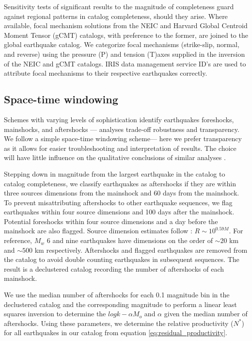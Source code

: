 \documentclass[12pt, notitlepage]{report}
\begin{document}
Sensitivity tests of significant results to the magnitude of completeness guard against regional patterns in catalog completeness, should they arise. Where available, focal mechanism solutions from the NEIC and Harvard Global Centroid Moment Tensor (gCMT) catalogs, with preference to the former, are joined to the global earthquake catalog. We categorize focal mechanisms (strike-slip, normal, and reverse) using the pressure (P) and tension (T)axes supplied in the inversion of the NEIC and gCMT catalogs. IRIS data management service ID's are used to attribute focal mechanisms to their respective earthquakes correctly. 

\subsection{Space-time windowing}

Schemes with varying levels of sophistication identify earthquakes foreshocks, mainshocks, and aftershocks — analyses trade-off robustness and transparency. We follow a simple space-time windowing scheme--- here we prefer transparency as it allows for easier troubleshooting and interpretation of results. The choice will have little influence on the qualitative conclusions of similar analyses \cite{Utsu1995}.

Stepping down in magnitude from the largest earthquake in the catalog to catalog completeness, we classify earthquakes as aftershocks if they are within three sources dimensions from the mainshock and 60 days from the mainshock. To prevent misattributing aftershocks to other earthquake sequences, we flag earthquakes within four source dimensions and 100 days after the mainshock. Potential foreshocks within four source dimensions and a day before the mainshock are also flagged. Source dimension estimates follow \textcite{Wells1994}: $R\sim10^{0.59M}$. For reference, $M_w$ 6 and nine earthquakes have dimensions on the order of $\sim 20$ km and $\sim 500$ km respectively. Aftershocks and flagged earthquakes are removed from the catalog to avoid double counting earthquakes in subsequent sequences. The result is a declustered catalog recording the number of aftershocks of each mainshock. 

We use the median number of aftershocks for each 0.1 magnitude bin in the declustered catalog and the corresponding magnitude to perform a linear least squares inversion to determine the $ log k - \alpha M_o $ and $\alpha$ given the median number of aftershocks. Using these parameters, we determine the relative productivity ($N^*$) for all earthquakes in our catalog from equation  \ref{eq:residual_productivity}.
\end{document}

